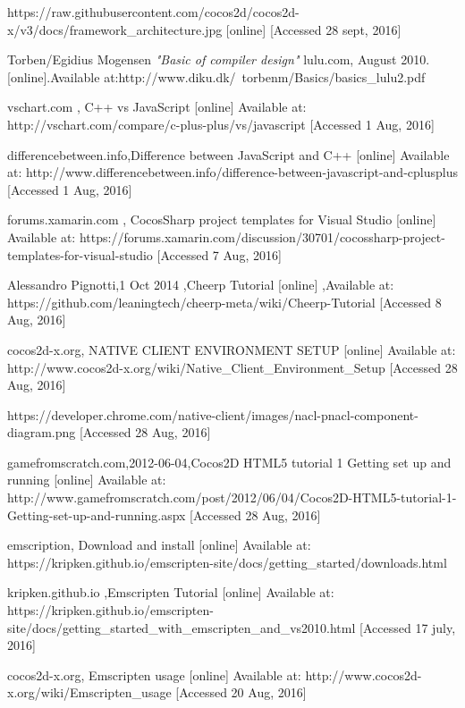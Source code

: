 \documentclass[23pt]{article}
\begin{document}
\begin{thebibliography}{9}
{https://raw.githubusercontent.com/cocos2d/cocos2d-x/v3/docs/framework\_architecture.jpg} [online]  [Accessed 28 sept, 2016]

Torben/Egidius Mogensen
\textit{"Basic of compiler design"}
 lulu.com, August 2010.
{[online].Available at:http://www.diku.dk/~torbenm/Basics/basics\_lulu2.pdf}

vschart.com , C++ vs JavaScript [online] Available at:
{http://vschart.com/compare/c-plus-plus/vs/javascript}   [Accessed 1 Aug, 2016]


differencebetween.info,Difference between JavaScript and C++ [online] Available at:
{http://www.differencebetween.info/difference-between-javascript-and-cplusplus}     [Accessed 1 Aug, 2016]


forums.xamarin.com , CocosSharp project templates for Visual Studio [online] Available at:
{https://forums.xamarin.com/discussion/30701/cocossharp-project-templates-for-visual-studio}   [Accessed 7 Aug, 2016]

Alessandro Pignotti,1 Oct 2014 ,Cheerp Tutorial [online] ,Available at:
{https://github.com/leaningtech/cheerp-meta/wiki/Cheerp-Tutorial}   [Accessed 8 Aug, 2016]

cocos2d-x.org, NATIVE CLIENT ENVIRONMENT SETUP  [online] Available at:
{http://www.cocos2d-x.org/wiki/Native\_Client\_Environment\_Setup} [Accessed 28 Aug, 2016]


{https://developer.chrome.com/native-client/images/nacl-pnacl-component-diagram.png}  [Accessed 28 Aug, 2016]

gamefromscratch.com,2012-06-04,Cocos2D HTML5 tutorial 1 Getting set up and running  [online] Available at:
{http://www.gamefromscratch.com/post/2012/06/04/Cocos2D-HTML5-tutorial-1-Getting-set-up-and-running.aspx}  [Accessed 28 Aug, 2016]

emscription, Download and install  [online] Available at:
{https://kripken.github.io/emscripten-site/docs/getting\_started/downloads.html}

 kripken.github.io ,Emscripten Tutorial [online] Available at:
{https://kripken.github.io/emscripten-site/docs/getting\_started\_with\_emscripten\_and\_vs2010.html} [Accessed 17 july, 2016]

 cocos2d-x.org, Emscripten usage [online] Available at:
{http://www.cocos2d-x.org/wiki/Emscripten\_usage} [Accessed 20 Aug, 2016]


\end{thebibliography}
\end{document}

